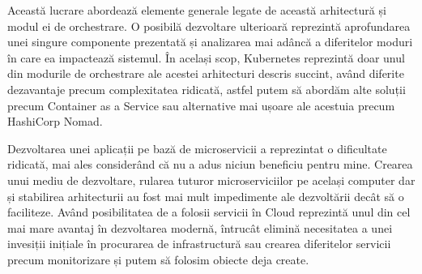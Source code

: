 Această lucrare abordează elemente generale legate de această arhitectură și modul ei de
orchestrare. O posibilă dezvoltare ulterioară reprezintă aprofundarea unei singure
componente prezentată și analizarea mai adâncă a diferitelor moduri în care ea impactează sistemul.
În același scop, Kubernetes reprezintă doar unul din modurile
de orchestrare ale acestei arhitecturi descris succint, având diferite dezavantaje precum complexitatea
ridicată, astfel putem să abordăm alte soluții precum Container as a Service
sau alternative mai ușoare ale acestuia precum HashiCorp Nomad.

Dezvoltarea unei aplicații pe bază de microservicii a reprezintat o dificultate ridicată,
mai ales considerând că nu a adus niciun beneficiu pentru mine. Crearea unui mediu de dezvoltare,
rularea tuturor microserviciilor pe același computer dar și stabilirea arhitecturii
au fost mai mult impedimente ale dezvoltării decât să o faciliteze. Având posibilitatea
de a folosii servicii în Cloud reprezintă unul din cel mai mare avantaj în dezvoltarea modernă,
întrucât elimină necesitatea a unei invesiții inițiale în procurarea de infrastructură
sau crearea diferitelor servicii precum monitorizare și putem să folosim obiecte deja create.
